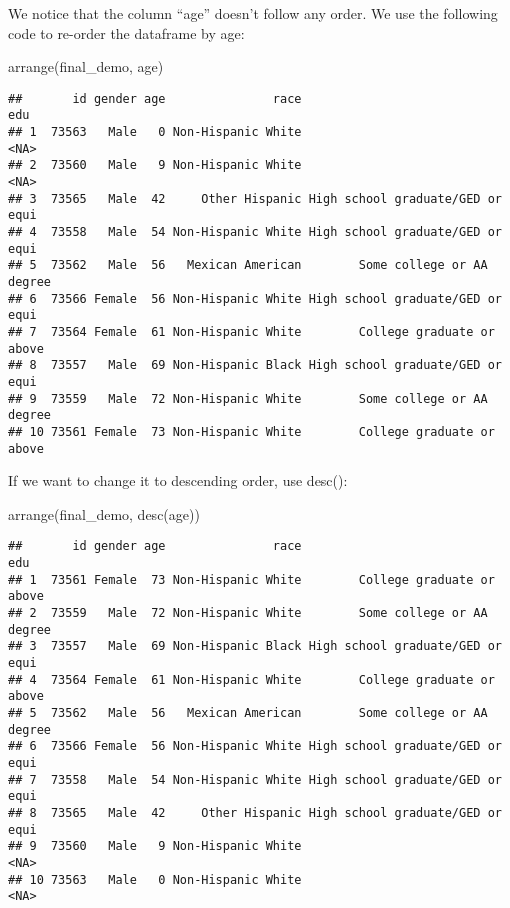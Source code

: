 \documentclass[
]{book}
\newenvironment{Shaded}{\begin{snugshade}}{\end{snugshade}}
\newcommand{\FunctionTok}[1]{\textcolor[rgb]{0.00,0.00,0.00}{#1}}
\newcommand{\NormalTok}[1]{#1}
\begin{document}
We notice that the column ``age'' doesn't follow any order. We use the following code to re-order the dataframe by age:

\begin{Shaded}
\begin{Highlighting}[]
\FunctionTok{arrange}\NormalTok{(final\_demo, age)}
\end{Highlighting}
\end{Shaded}

\begin{verbatim}
##       id gender age               race                              edu
## 1  73563   Male   0 Non-Hispanic White                             <NA>
## 2  73560   Male   9 Non-Hispanic White                             <NA>
## 3  73565   Male  42     Other Hispanic High school graduate/GED or equi
## 4  73558   Male  54 Non-Hispanic White High school graduate/GED or equi
## 5  73562   Male  56   Mexican American        Some college or AA degree
## 6  73566 Female  56 Non-Hispanic White High school graduate/GED or equi
## 7  73564 Female  61 Non-Hispanic White        College graduate or above
## 8  73557   Male  69 Non-Hispanic Black High school graduate/GED or equi
## 9  73559   Male  72 Non-Hispanic White        Some college or AA degree
## 10 73561 Female  73 Non-Hispanic White        College graduate or above
\end{verbatim}

If we want to change it to descending order, use desc():

\begin{Shaded}
\begin{Highlighting}[]
\FunctionTok{arrange}\NormalTok{(final\_demo, }\FunctionTok{desc}\NormalTok{(age))}
\end{Highlighting}
\end{Shaded}

\begin{verbatim}
##       id gender age               race                              edu
## 1  73561 Female  73 Non-Hispanic White        College graduate or above
## 2  73559   Male  72 Non-Hispanic White        Some college or AA degree
## 3  73557   Male  69 Non-Hispanic Black High school graduate/GED or equi
## 4  73564 Female  61 Non-Hispanic White        College graduate or above
## 5  73562   Male  56   Mexican American        Some college or AA degree
## 6  73566 Female  56 Non-Hispanic White High school graduate/GED or equi
## 7  73558   Male  54 Non-Hispanic White High school graduate/GED or equi
## 8  73565   Male  42     Other Hispanic High school graduate/GED or equi
## 9  73560   Male   9 Non-Hispanic White                             <NA>
## 10 73563   Male   0 Non-Hispanic White                             <NA>
\end{verbatim}
\end{document}
